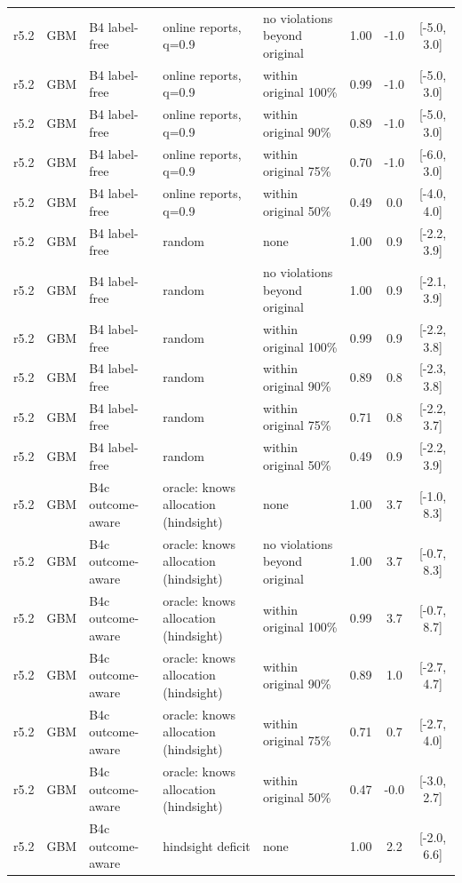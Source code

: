 \documentclass[10pt,onecolumn,letterpaper]{article}
\begin{document}
\begin{longtable}{lllp{4.2cm}p{3.4cm}ccc}
r5.2 & GBM & B4 label-free & online reports, q=0.9 & no violations beyond original & 1.00 & -1.0 & [-5.0, 3.0] \\
r5.2 & GBM & B4 label-free & online reports, q=0.9 & within original 100\% & 0.99 & -1.0 & [-5.0, 3.0] \\
r5.2 & GBM & B4 label-free & online reports, q=0.9 & within original 90\% & 0.89 & -1.0 & [-5.0, 3.0] \\
r5.2 & GBM & B4 label-free & online reports, q=0.9 & within original 75\% & 0.70 & -1.0 & [-6.0, 3.0] \\
r5.2 & GBM & B4 label-free & online reports, q=0.9 & within original 50\% & 0.49 & 0.0 & [-4.0, 4.0] \\
r5.2 & GBM & B4 label-free & random & none & 1.00 & 0.9 & [-2.2, 3.9] \\
r5.2 & GBM & B4 label-free & random & no violations beyond original & 1.00 & 0.9 & [-2.1, 3.9] \\
r5.2 & GBM & B4 label-free & random & within original 100\% & 0.99 & 0.9 & [-2.2, 3.8] \\
r5.2 & GBM & B4 label-free & random & within original 90\% & 0.89 & 0.8 & [-2.3, 3.8] \\
r5.2 & GBM & B4 label-free & random & within original 75\% & 0.71 & 0.8 & [-2.2, 3.7] \\
r5.2 & GBM & B4 label-free & random & within original 50\% & 0.49 & 0.9 & [-2.2, 3.9] \\
r5.2 & GBM & B4c outcome-aware & oracle: knows allocation (hindsight) & none & 1.00 & 3.7 & [-1.0, 8.3] \\
r5.2 & GBM & B4c outcome-aware & oracle: knows allocation (hindsight) & no violations beyond original & 1.00 & 3.7 & [-0.7, 8.3] \\
r5.2 & GBM & B4c outcome-aware & oracle: knows allocation (hindsight) & within original 100\% & 0.99 & 3.7 & [-0.7, 8.7] \\
r5.2 & GBM & B4c outcome-aware & oracle: knows allocation (hindsight) & within original 90\% & 0.89 & 1.0 & [-2.7, 4.7] \\
r5.2 & GBM & B4c outcome-aware & oracle: knows allocation (hindsight) & within original 75\% & 0.71 & 0.7 & [-2.7, 4.0] \\
r5.2 & GBM & B4c outcome-aware & oracle: knows allocation (hindsight) & within original 50\% & 0.47 & -0.0 & [-3.0, 2.7] \\
r5.2 & GBM & B4c outcome-aware & hindsight deficit & none & 1.00 & 2.2 & [-2.0, 6.6] \\

\end{longtable}
\end{document}
